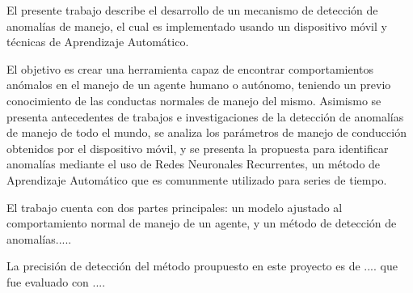 El presente trabajo describe el desarrollo de un mecanismo de detecci\'{o}n de anomal\'{i}as de manejo, el cual es implementado usando un dispositivo m\'{o}vil y t\'{e}cnicas de Aprendizaje Autom\'{a}tico. 

El objetivo es crear una herramienta capaz de encontrar comportamientos an\'{o}malos en el manejo de un agente humano o aut\'{o}nomo, teniendo un previo conocimiento de las conductas normales de manejo del mismo. Asimismo se presenta antecedentes de trabajos e investigaciones de la detecci\'{o}n de anomal\'{i}as de manejo de todo el mundo, se analiza los par\'{a}metros de manejo de conducci\'{o}n obtenidos por el dispositivo m\'{o}vil, y se presenta la propuesta para identificar anomal\'{i}as mediante el uso de Redes Neuronales Recurrentes, un m\'{e}todo de Aprendizaje Autom\'{a}tico que es comunmente utilizado para series de tiempo.

El trabajo cuenta con dos partes principales: un modelo ajustado al comportamiento normal de manejo de un agente, y un m\'{e}todo de detecci\'{o}n de anomal\'{i}as.....

La precisi\'{o}n de detecci\'{o}n del m\'{e}todo proupuesto en este proyecto es de .... que fue evaluado con .... 





